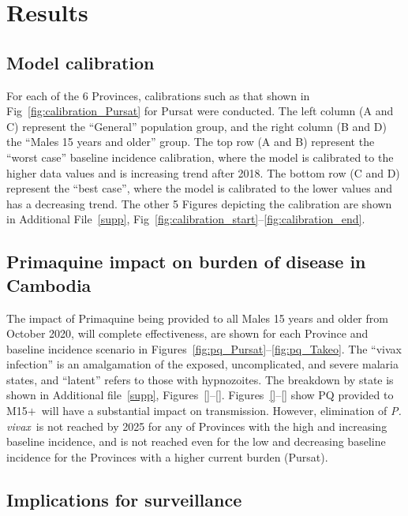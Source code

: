 \documentclass[doublespacing]{bmcart}
\newcommand{\pv}{\textit{P. vivax}}
\newcommand{\males}{M15$+$}
\begin{document}
\section*{Results}

\subsection*{Model calibration}
For each of the 6 Provinces, calibrations such as that shown in Fig~\ref{fig:calibration_Pursat} for Pursat were conducted. The left column (A and C) represent the ``General'' population group, and the right column (B and D) the ``Males 15 years and older'' group. The top row (A and B) represent the ``worst case'' baseline incidence calibration, where the model is calibrated to the higher data values and is increasing trend after 2018. The bottom row (C and D) represent the ``best case'', where the model is calibrated to the lower values and has a decreasing trend. The other 5 Figures depicting the calibration are shown in Additional File~\ref{supp}, Fig~\ref{fig:calibration_start}--\ref{fig:calibration_end}.

\subsection*{Primaquine impact on burden of disease in Cambodia} \label{sec:impact}

The impact of Primaquine being provided to all Males 15 years and older from October 2020, will complete effectiveness, are shown for each Province and baseline incidence scenario in Figures~\ref{fig:pq_Pursat}--\ref{fig:pq_Takeo}. The ``vivax infection'' is an amalgamation of the exposed, uncomplicated, and severe malaria states, and ``latent'' refers to those with hypnozoites. The breakdown by state is shown in Additional file~\ref{supp}, Figures~\ref{}--\ref{}. Figures~\ref{}--\ref{} show PQ provided to \males~will have a substantial impact on transmission. However, elimination of \pv~is not reached by 2025 for any of Provinces with the high and increasing baseline incidence, and is not reached even for the low and decreasing baseline incidence for the Provinces with a higher current burden (Pursat). 

\subsection*{Implications for surveillance}
\end{document}
